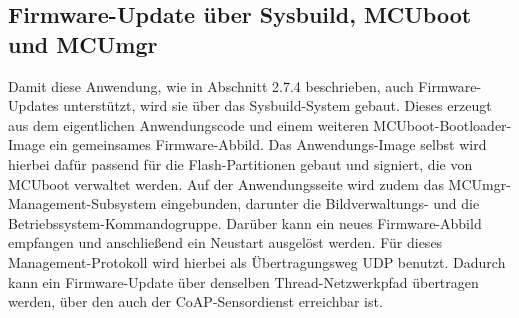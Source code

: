 \subsection{Firmware-Update {\"u}ber Sysbuild, MCUboot und MCUmgr}
Damit diese Anwendung, wie in Abschnitt 2.7.4 beschrieben, auch Firmware-Updates unterst{\"u}tzt, wird sie {\"u}ber das Sysbuild-System gebaut. Dieses erzeugt aus dem eigentlichen Anwendungscode und einem weiteren MCUboot-Bootloader-Image ein gemeinsames Firmware-Abbild. Das Anwendungs-Image selbst wird hierbei daf{\"u}r passend f{\"u}r die Flash-Partitionen gebaut und signiert, die von MCUboot verwaltet werden. Auf der Anwendungsseite wird zudem das MCUmgr-Management-Subsystem eingebunden, darunter die Bildverwaltungs- und die Betriebssystem-Kommandogruppe. Dar{\"u}ber kann ein neues Firmware-Abbild empfangen und anschlie{\ss}end ein Neustart ausgel{\"o}st werden. F{\"u}r dieses Management-Protokoll wird hierbei als {\"U}bertragungsweg UDP benutzt. Dadurch kann ein Firmware-Update {\"u}ber denselben Thread-Netzwerkpfad {\"u}bertragen werden, {\"u}ber den auch der CoAP-Sensordienst erreichbar ist.
